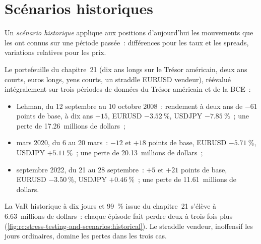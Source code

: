 \section{Scénarios historiques}

\begin{definition}\label{def:rc:stress-testing-and-scenarios:historical}
Un \emph{scénario historique} applique aux positions d'aujourd'hui les mouvements que les
 ont connus sur une période passée~: différences pour les taux et les spreads, variations relatives
pour les prix.
\end{definition}

\begin{example}\label{ex:rc:stress-testing-and-scenarios:historical}
Le portefeuille du chapitre~21 (dix ans longs sur le Trésor américain, deux ans courts, euros longs, yens courts, un
straddle EURUSD vendeur), réévalué intégralement sur trois périodes de données du Trésor américain et de la BCE~:
\begin{itemize}
\item Lehman, du 12 septembre au 10 octobre 2008~: rendement à deux ans de $-61$ points de base, à dix ans $+15$,
EURUSD $-3.52~\%$, USDJPY $-7.85~\%$~; une perte de 17.26~millions de dollars~;
\item mars 2020, du 6 au 20 mars~: $-12$ et $+18$ points de base, EURUSD $-5.71~\%$, USDJPY $+5.11~\%$~; une
perte de 20.13~millions de dollars~;
\item septembre 2022, du 21 au 28 septembre~: $+5$ et $+21$ points de base, EURUSD $-3.50~\%$, USDJPY
$+0.46~\%$~; une perte de 11.61~millions de dollars.
\end{itemize}
La VaR historique à dix jours et 99~\% issue du chapitre~21 s'élève à 6.63~millions de dollars~: chaque épisode fait perdre deux
à trois fois plus (\cref{fig:rc:stress-testing-and-scenarios:historical}). Le straddle vendeur,
inoffensif les jours ordinaires, domine les pertes dans les trois cas.
\end{example}

